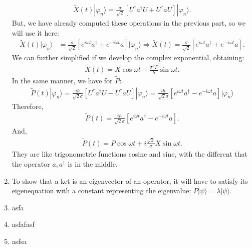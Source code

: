 \documentclass[letterpaper,11pt,twoside]{article}
\newcommand{\ket}[1]{|#1\rangle}
\begin{document}
\begin{enumerate}[itemsep=0pt,topsep=0pt,label=\alph*)]
\begin{align*}
    \tilde{X}(t)\ket{\varphi_n}=\frac{\sigma}{\sqrt{2}}\left[U^\dagger a^\dagger U+U^\dagger aU\right]\ket{\varphi_n}.
  \end{align*}
  But, we have already computed these operations in the previous part, so we will use it here:
  \begin{align*}
    \tilde{X}(t)\ket{\varphi_n}&=\frac{\sigma}{\sqrt{2}}\left[e^{i\omega t}a^\dagger+e^{-i\omega t}a\right]\ket{\varphi_n}\Longrightarrow \tilde{X}(t)=\frac{\sigma}{\sqrt{2}}\left[e^{i\omega t}a^\dagger+e^{-i\omega t}a\right].
  \end{align*}
  We can further simplified if we develop the complex exponential, obtaining:
  \begin{align*}
    \tilde{X}(t)=X\cos\omega t+\frac{\sigma^2P}{\hbar}\sin\omega t.
  \end{align*}
  In the same manner, we have for $\tilde{P}$:
  \begin{align*}
    \tilde{P}(t)\ket{\varphi_n}=\frac{i\hbar}{\sqrt{2}\sigma}\left[U^\dagger a^\dagger U-U^\dagger aU\right]\ket{\varphi_n}=\frac{i\hbar}{\sqrt{2}\sigma}\left[e^{i\omega t}a^\dagger-e^{-i\omega t}a\right]\ket{\varphi_n}
  \end{align*}
  Therefore,
  \begin{align*}
    \tilde{P}(t)=\frac{i\hbar}{\sqrt{2}\sigma}\left[e^{i\omega t}a^\dagger-e^{-i\omega t}a\right].
  \end{align*}
  And, 
  \begin{align*}
    \tilde{P}(t)=P\cos\omega t+i\frac{\sqrt{2}}{\sigma}X\sin\omega t.
  \end{align*}
  They are like trigonometric functions cosine and sine, with the different that the operator $a,a^\dagger$ is in the middle.
  \item To show that a ket is an eigenvector of an operator, it will have to satisfy its eigenequation with a constant representing the eigenvalue: $P\ket{\psi}=\lambda\ket{\psi}$.
  \item asfa
  \item asfafasf
  \item asfsa
\end{enumerate}
\end{document}
